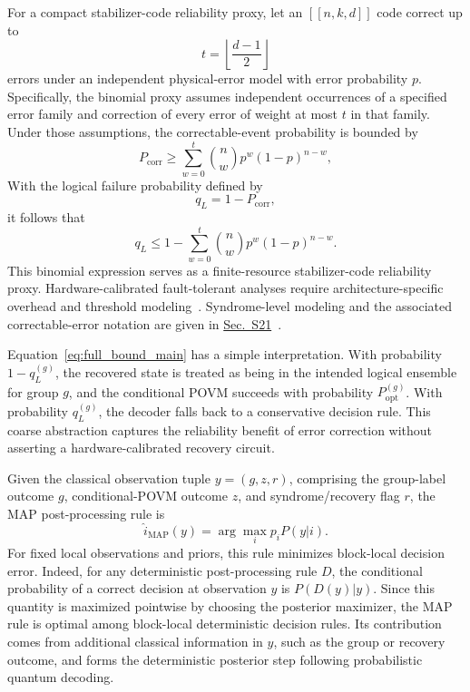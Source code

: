 For a compact stabilizer-code reliability proxy, let an $[[n,k,d]]$ code correct up to
\begin{equation}
    t=\left\lfloor\frac{d-1}{2}\right\rfloor
    \label{eq:t_correct_main}
\end{equation}
errors under an independent physical-error model with error probability $p$. Specifically, the binomial proxy assumes independent occurrences of a specified error family and correction of every error of weight at most $t$ in that family. Under those assumptions, the correctable-event probability is bounded by
\begin{equation}
    P_{\mathrm{corr}}
    \ge
    \sum_{w=0}^{t}
    \binom{n}{w}p^w(1-p)^{n-w},
    \label{eq:pcorr_proxy_main}
\end{equation}
With the logical failure probability defined by
\begin{equation}
    q_L=1-P_{\mathrm{corr}},
    \label{eq:ql_definition_main}
\end{equation}
it follows that
\begin{equation}
    q_L
    \le
    1-
    \sum_{w=0}^{t}
    \binom{n}{w}p^w(1-p)^{n-w}.
    \label{eq:ql_proxy_main}
\end{equation}
This binomial expression serves as a finite-resource stabilizer-code reliability proxy. Hardware-calibrated fault-tolerant analyses require architecture-specific overhead and threshold modeling~\cite{fowler2012surface,terhal2015quantum,campbell2017roads}. Syndrome-level modeling and the associated correctable-error notation are given in \hyperref[app:qec_sdp_details]{Sec.~S21}~\cite{shor1995scheme,steane1996error,calderbank1996good,gottesman1997stabilizer,lidar2013quantum}.

Equation~\eqref{eq:full_bound_main} has a simple interpretation. With probability $1-q_L^{(g)}$, the recovered state is treated as being in the intended logical ensemble for group $g$, and the conditional POVM succeeds with probability $P_{\mathrm{opt}}^{(g)}$. With probability $q_L^{(g)}$, the decoder falls back to a conservative decision rule. This coarse abstraction captures the reliability benefit of error correction without asserting a hardware-calibrated recovery circuit.

Given the classical observation tuple $y=(g,z,r)$, comprising the group-label outcome $g$, conditional-POVM outcome $z$, and syndrome/recovery flag $r$, the MAP post-processing rule is
\begin{equation}
    \hat i_{\mathrm{MAP}}(y)=\arg\max_i p_i P(y|i).
    \label{eq:map_rule_main}
\end{equation}
For fixed local observations and priors, this rule minimizes block-local decision error. Indeed, for any deterministic post-processing rule \(D\), the conditional probability of a correct decision at observation \(y\) is \(P(D(y)|y)\). Since this quantity is maximized pointwise by choosing the posterior maximizer, the MAP rule is optimal among block-local deterministic decision rules. Its contribution comes from additional classical information in $y$, such as the group or recovery outcome, and forms the deterministic posterior step following probabilistic quantum decoding.

